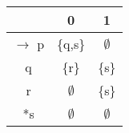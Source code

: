 \documentclass[12pt,a4paper]{article}
\begin{document}
\begin{table}[h]
	\centering
	\begin{tabular}{|c|c|c|}
		\hline
		 & 0 & 1 \\
		\hline
		$\rightarrow$ p & \{q,s\} & $\emptyset$\\
		q & \{r\} & \{s\}\\
		r & $\emptyset$ & \{s\}\\
		*s & $\emptyset$ & $\emptyset$\\
		\hline
	\end{tabular}
\end{table}
\end{document}
